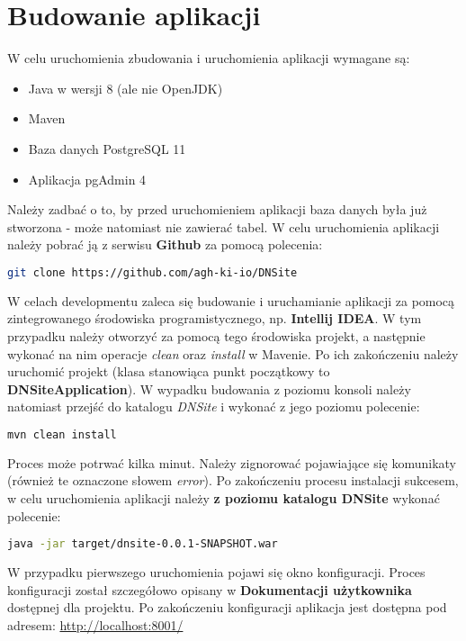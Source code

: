 \documentclass[11pt]{article}
\begin{document}
\section{Budowanie aplikacji}
W celu uruchomienia zbudowania i uruchomienia aplikacji wymagane są:
\begin{itemize}
\item Java w wersji 8 (ale nie OpenJDK)
\item Maven
\item Baza danych PostgreSQL 11
\item Aplikacja pgAdmin 4
\end{itemize}
Należy zadbać o to, by przed uruchomieniem aplikacji baza danych była już stworzona - może natomiast nie zawierać tabel.
W celu uruchomienia aplikacji należy pobrać ją z serwisu \textbf{Github} za pomocą polecenia:
\begin{lstlisting}[language=bash]
git clone https://github.com/agh-ki-io/DNSite
\end{lstlisting}
W celach developmentu zaleca się budowanie i uruchamianie aplikacji za pomocą zintegrowanego środowiska programistycznego, np. \textbf{Intellij IDEA}. W tym przypadku należy otworzyć za pomocą tego środowiska projekt, a następnie wykonać na nim operacje \emph{clean} oraz \emph{install} w Mavenie. Po ich zakończeniu należy uruchomić projekt (klasa stanowiąca punkt początkowy to \textbf{DNSiteApplication}). \newline
W wypadku budowania z poziomu konsoli należy natomiast przejść do katalogu \emph{DNSite} i wykonać z jego poziomu polecenie:
\begin{lstlisting}[language=bash]
mvn clean install
\end{lstlisting}
Proces może potrwać kilka minut. Należy zignorować pojawiające się komunikaty (również te oznaczone słowem \emph{error}). Po zakończeniu procesu instalacji sukcesem, w celu uruchomienia aplikacji należy \textbf{z poziomu katalogu DNSite} wykonać polecenie:
\begin{lstlisting}[language=bash]
java -jar target/dnsite-0.0.1-SNAPSHOT.war
\end{lstlisting}
W przypadku pierwszego uruchomienia pojawi się okno konfiguracji. Proces konfiguracji został szczegółowo opisany w \textbf{Dokumentacji użytkownika} dostępnej dla projektu. Po zakończeniu konfiguracji aplikacja jest dostępna pod adresem: \url{http://localhost:8001/}
\end{document}
